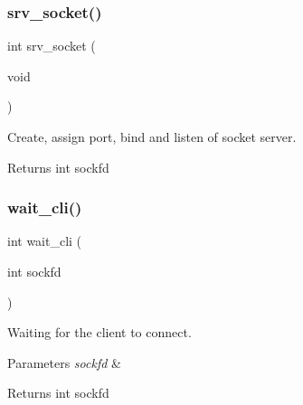 \mbox{\label{socket_8c_abaa85d7aff16c338adf9a408c151bc28}} 
\subsubsection{srv\+\_\+socket()}
{\footnotesize\ttfamily int srv\+\_\+socket (\begin{DoxyParamCaption}\item[{void}]{ }\end{DoxyParamCaption})}



Create, assign port, bind and listen of socket server. 

\begin{DoxyReturn}{Returns}
int sockfd 
\end{DoxyReturn}
\mbox{\label{socket_8c_ad26b08974642b47dc5bf48289824f655}} 
\subsubsection{wait\+\_\+cli()}
{\footnotesize\ttfamily int wait\+\_\+cli (\begin{DoxyParamCaption}\item[{int}]{sockfd }\end{DoxyParamCaption})}



Waiting for the client to connect. 


\begin{DoxyParams}{Parameters}
{\em sockfd} & \\
\hline
\end{DoxyParams}
\begin{DoxyReturn}{Returns}
int sockfd 
\end{DoxyReturn}
